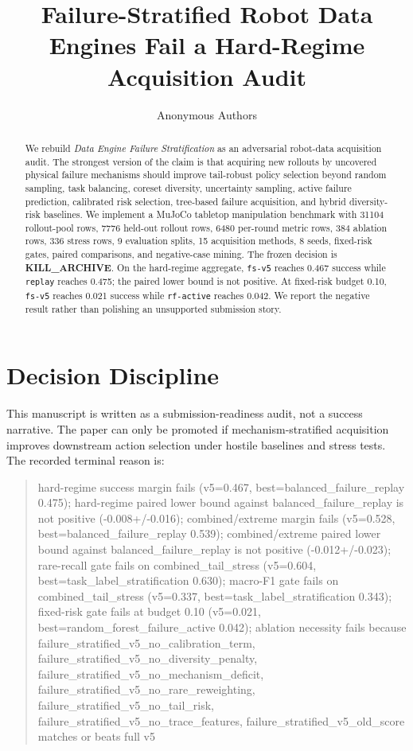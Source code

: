 \documentclass{article}
\title{Failure-Stratified Robot Data Engines Fail a Hard-Regime Acquisition Audit}
\author{Anonymous Authors}
\begin{document}
\maketitle

\begin{abstract}
We rebuild \emph{Data Engine Failure Stratification} as an adversarial robot-data acquisition audit. The strongest version of the claim is that acquiring new rollouts by uncovered physical failure mechanisms should improve tail-robust policy selection beyond random sampling, task balancing, coreset diversity, uncertainty sampling, active failure prediction, calibrated risk selection, tree-based failure acquisition, and hybrid diversity-risk baselines. We implement a MuJoCo tabletop manipulation benchmark with 31104 rollout-pool rows, 7776 held-out rollout rows, 6480 per-round metric rows, 384 ablation rows, 336 stress rows, 9 evaluation splits, 15 acquisition methods, 8 seeds, fixed-risk gates, paired comparisons, and negative-case mining. The frozen decision is \textbf{KILL\_ARCHIVE}. On the hard-regime aggregate, \texttt{fs-v5} reaches 0.467 success while \texttt{replay} reaches 0.475; the paired lower bound is not positive. At fixed-risk budget 0.10, \texttt{fs-v5} reaches 0.021 success while \texttt{rf-active} reaches 0.042. We report the negative result rather than polishing an unsupported submission story.
\end{abstract}

\section{Decision Discipline}
This manuscript is written as a submission-readiness audit, not a success narrative. The paper can only be promoted if mechanism-stratified acquisition improves downstream action selection under hostile baselines and stress tests. The recorded terminal reason is:

\begin{quote}\small
hard-regime success margin fails (v5=0.467, best=balanced\_failure\_replay 0.475); hard-regime paired lower bound against balanced\_failure\_replay is not positive (-0.008+/-0.016); combined/extreme margin fails (v5=0.528, best=balanced\_failure\_replay 0.539); combined/extreme paired lower bound against balanced\_failure\_replay is not positive (-0.012+/-0.023); rare-recall gate fails on combined\_tail\_stress (v5=0.604, best=task\_label\_stratification 0.630); macro-F1 gate fails on combined\_tail\_stress (v5=0.337, best=task\_label\_stratification 0.343); fixed-risk gate fails at budget 0.10 (v5=0.021, best=random\_forest\_failure\_active 0.042); ablation necessity fails because failure\_stratified\_v5\_no\_calibration\_term, failure\_stratified\_v5\_no\_diversity\_penalty, failure\_stratified\_v5\_no\_mechanism\_deficit, failure\_stratified\_v5\_no\_rare\_reweighting, failure\_stratified\_v5\_no\_tail\_risk, failure\_stratified\_v5\_no\_trace\_features, failure\_stratified\_v5\_old\_score matches or beats full v5
\end{quote}
\end{document}
